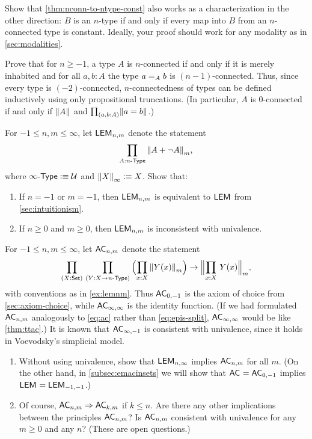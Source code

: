 \documentclass[hott-all.tex]{subfiles}
\begin{document}
\begin{ex}
  Show that \cref{thm:nconn-to-ntype-const} also works as a characterization in the other direction: $B$ is an $n$-type if and only if every map into $B$ from an $n$-con\-nect\-ed type is constant.
  Ideally, your proof should work for any modality as in \cref{sec:modalities}.
\end{ex}

\begin{ex}
  Prove that for $n\ge -1$, a type $A$ is $n$-connected if and only if it is merely inhabited and for all $a,b:A$ the type $\id[A]ab$ is $(n-1)$-connected.
  Thus, since every type is $(-2)$-connected, $n$-connectedness of types can be defined inductively using only propositional truncations.
  (In particular, $A$ is 0-connected if and only if $\brck{A}$ and $\prd{a,b:A} \brck{a=b}$.)
\end{ex}

\begin{ex}
  For $-1\le n,m \le\infty$, let $\LEM{n,m}$ denote the statement
  \[ \prd{A:\ntype{n}} \trunc m{A + \neg A},\]
  where $\ntype{\infty} \defeq \type$ and $\trunc{\infty}{X}\defeq X$.
  Show that:
  \begin{enumerate}
  \item If $n=-1$ or $m=-1$, then $\LEM{n,m}$ is equivalent to $\LEM{}$ from \cref{sec:intuitionism}.
  \item If $n\ge 0$ and $m\ge 0$, then $\LEM{n,m}$ is inconsistent with univalence.
  \end{enumerate}
\end{ex}

\begin{ex}
  For $-1\le n,m\le\infty$, let $\choice{n,m}$ denote the statement
  \[ \prd{X:\set}{Y:X\to\ntype{n}}
  \Parens{\prd{x:X} \trunc m{Y(x)}}
  \to
  \Trunc m{\prd{x:X} Y(x)},
  \]
  with conventions as in \cref{ex:lemnm}.
  Thus $\choice{0,-1}$ is the axiom of choice from \cref{sec:axiom-choice},
  while $\choice{\infty,\infty}$ is the identity function.
  (If we had formulated $\choice{n,m}$ analogously to \eqref{eq:ac}
  rather than \eqref{eq:epis-split},
  $\choice{\infty,\infty}$ would be like \cref{thm:ttac}.)
  It is known that $\choice{\infty,-1}$ is consistent with univalence, since it holds in Voevodsky's simplicial model.
  \begin{enumerate}
  \item Without using univalence, show that $\LEM{n,\infty}$ implies $\choice{n,m}$ for all $m$.
    (On the other hand, in \cref{subsec:emacinsets} we will show that $\choice{}=\choice{0,-1}$ implies $\LEM{}=\LEM{-1,-1}$.)
  \item Of course, $\choice{n,m}\Rightarrow \choice{k,m}$ if $k\le n$.
    Are there any other implications between the principles $\choice{n,m}$?
    Is $\choice{n,m}$ consistent with univalence for any $m\ge 0$ and any $n$?
    (These are open questions.)
  \end{enumerate}
\end{ex}
\end{document}
